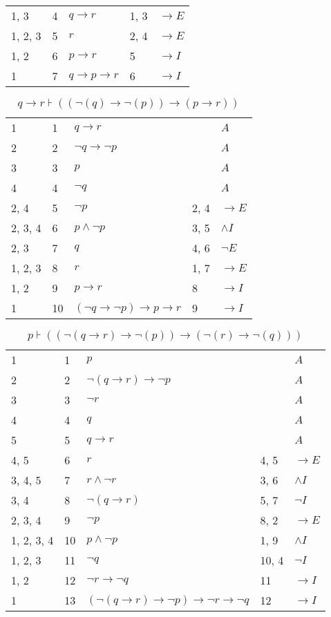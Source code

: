 \documentclass{article}
\begin{document}
\begin{table}[htbp]
\begin{tabular}{lllll}
{1, 3} & 4 & $q→r$ & {1, 3} & $→E$ \\
{1, 2, 3} & 5 & $r$ & {2, 4} & $→E$ \\
{1, 2} & 6 & $p→r$ & {5} & $→I$ \\
{1} & 7 & $q→p→r$ & {6} & $→I$ \\
\end{tabular}
\end{table}\begin{table}[htbp]\caption*{$q→r ⊦ ((¬(q)→ ¬(p))→ (p→r))$}\centering\begin{tabular}{lllll}
{1} & 1 & $q→r$ & {} & $A$ \\
{2} & 2 & $¬q→ ¬p$ & {} & $A$ \\
{3} & 3 & $p$ & {} & $A$ \\
{4} & 4 & $¬q$ & {} & $A$ \\
{2, 4} & 5 & $¬p$ & {2, 4} & $→E$ \\
{2, 3, 4} & 6 & $p∧ ¬p$ & {3, 5} & $∧I$ \\
{2, 3} & 7 & $q$ & {4, 6} & $¬E$ \\
{1, 2, 3} & 8 & $r$ & {1, 7} & $→E$ \\
{1, 2} & 9 & $p→r$ & {8} & $→I$ \\
{1} & 10 & $(¬q→ ¬p)→p→r$ & {9} & $→I$ \\
\end{tabular}
\end{table}\begin{table}[htbp]\caption*{$p ⊦ ((¬(q→r)→ ¬(p))→ (¬(r)→ ¬(q)))$}\centering\begin{tabular}{lllll}
{1} & 1 & $p$ & {} & $A$ \\
{2} & 2 & $¬ (q→r)→ ¬p$ & {} & $A$ \\
{3} & 3 & $¬r$ & {} & $A$ \\
{4} & 4 & $q$ & {} & $A$ \\
{5} & 5 & $q→r$ & {} & $A$ \\
{4, 5} & 6 & $r$ & {4, 5} & $→E$ \\
{3, 4, 5} & 7 & $r∧ ¬r$ & {3, 6} & $∧I$ \\
{3, 4} & 8 & $¬ (q→r)$ & {5, 7} & $¬I$ \\
{2, 3, 4} & 9 & $¬p$ & {8, 2} & $→E$ \\
{1, 2, 3, 4} & 10 & $p∧ ¬p$ & {1, 9} & $∧I$ \\
{1, 2, 3} & 11 & $¬q$ & {10, 4} & $¬I$ \\
{1, 2} & 12 & $¬r→ ¬q$ & {11} & $→I$ \\
{1} & 13 & $(¬ (q→r)→ ¬p)→ ¬r→ ¬q$ & {12} & $→I$ \\
\end{tabular}
\end{table}
\end{document}
